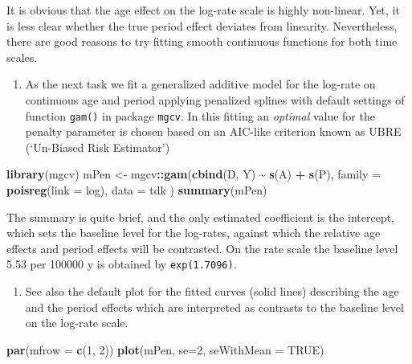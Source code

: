 \documentclass[
]{book}
\newenvironment{Shaded}{\begin{snugshade}}{\end{snugshade}}
\newcommand{\AttributeTok}[1]{\textcolor[rgb]{0.13,0.29,0.53}{#1}}
\newcommand{\ConstantTok}[1]{\textcolor[rgb]{0.56,0.35,0.01}{#1}}
\newcommand{\DecValTok}[1]{\textcolor[rgb]{0.00,0.00,0.81}{#1}}
\newcommand{\FunctionTok}[1]{\textcolor[rgb]{0.13,0.29,0.53}{\textbf{#1}}}
\newcommand{\NormalTok}[1]{#1}
\newcommand{\OtherTok}[1]{\textcolor[rgb]{0.56,0.35,0.01}{#1}}
\newcommand{\SpecialCharTok}[1]{\textcolor[rgb]{0.81,0.36,0.00}{\textbf{#1}}}
\providecommand{\tightlist}{%
  \setlength{\itemsep}{0pt}\setlength{\parskip}{0pt}}
\begin{document}
It is obvious that the age effect on the log-rate scale is highly
non-linear. Yet, it is less clear whether the true period effect
deviates from linearity. Nevertheless, there are good reasons to
try fitting smooth continuous functions for both time scales.

\begin{enumerate}
\def\labelenumi{\arabic{enumi}.}
\tightlist
\item
  As the next task we fit a generalized additive model for the
  log-rate on continuous age and period applying penalized splines
  with default settings of function \texttt{gam()} in package
  \texttt{mgcv}. In this fitting an \emph{optimal} value for the penalty
  parameter is chosen based on an AIC-like criterion known as UBRE
  (`Un-Biased Risk Estimator')
\end{enumerate}

\begin{Shaded}
\begin{Highlighting}[]
\FunctionTok{library}\NormalTok{(mgcv)}
\NormalTok{mPen }\OtherTok{\textless{}{-}}\NormalTok{ mgcv}\SpecialCharTok{::}\FunctionTok{gam}\NormalTok{(}\FunctionTok{cbind}\NormalTok{(D, Y) }\SpecialCharTok{\textasciitilde{}} \FunctionTok{s}\NormalTok{(A) }\SpecialCharTok{+} \FunctionTok{s}\NormalTok{(P),}
  \AttributeTok{family =} \FunctionTok{poisreg}\NormalTok{(}\AttributeTok{link =}\NormalTok{ log), }\AttributeTok{data =}\NormalTok{ tdk}
\NormalTok{)}
\FunctionTok{summary}\NormalTok{(mPen)}
\end{Highlighting}
\end{Shaded}

The summary is quite brief, and the only estimated coefficient is the
intercept, which sets the baseline level for the log-rates, against
which the relative age effects and period effects will be contrasted.
On the rate scale the baseline level 5.53 per 100000 y is obtained by
\texttt{exp(1.7096)}.

\begin{enumerate}
\def\labelenumi{\arabic{enumi}.}
\setcounter{enumi}{1}
\tightlist
\item
  See also the default plot for the fitted curves (solid lines)
  describing the age and the period effects which are interpreted as
  contrasts to the baseline level on the log-rate scale.
\end{enumerate}

\begin{Shaded}
\begin{Highlighting}[]
\FunctionTok{par}\NormalTok{(}\AttributeTok{mfrow =} \FunctionTok{c}\NormalTok{(}\DecValTok{1}\NormalTok{, }\DecValTok{2}\NormalTok{))}
\FunctionTok{plot}\NormalTok{(mPen, }\AttributeTok{se=}\DecValTok{2}\NormalTok{, }\AttributeTok{seWithMean =} \ConstantTok{TRUE}\NormalTok{)}
\end{Highlighting}
\end{Shaded}
\end{document}
